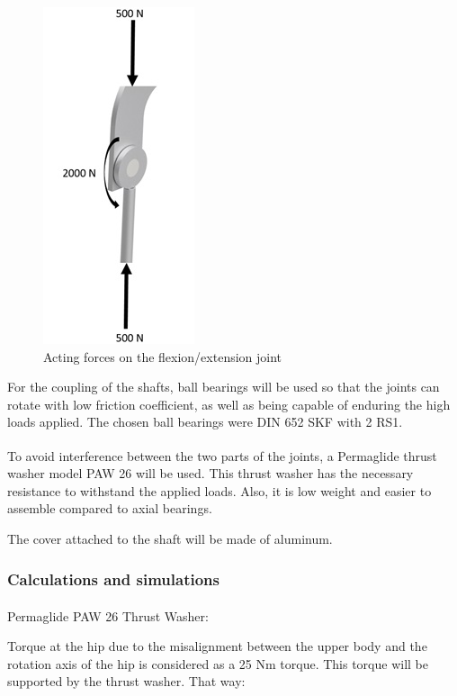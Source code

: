       \begin{figure}[thpb]
      \centering
      \includegraphics[scale=0.7]{Images/junta_quadril_2_forcas.jpg}
      \caption{Acting forces on the flexion/extension joint}
      \label{junta quadril 2 forcas}
   \end{figure}
   
   For the coupling of the shafts, ball bearings will be used so that the joints can rotate with low friction coefficient, as well as being capable of enduring the high loads applied. The chosen ball bearings were DIN 652 SKF with 2 RS1.
   
   To avoid interference between the two parts of the joints, a Permaglide\textsuperscript{\textregistered} thrust washer model PAW 26 will be used. This thrust washer has the necessary resistance to withstand the applied loads. Also, it is low weight and easier to assemble compared to axial bearings.
   
   The cover attached to the shaft will be made of aluminum.
   
   \bigskip
   
   \subsubsection{Calculations and simulations}
   
   Permaglide\textsuperscript{\textregistered} PAW 26 Thrust Washer:
   
   Torque at the hip due to the misalignment between the upper body and the rotation axis of the hip is considered as a 25 Nm torque. This torque will be supported by the thrust washer. That way:
   
